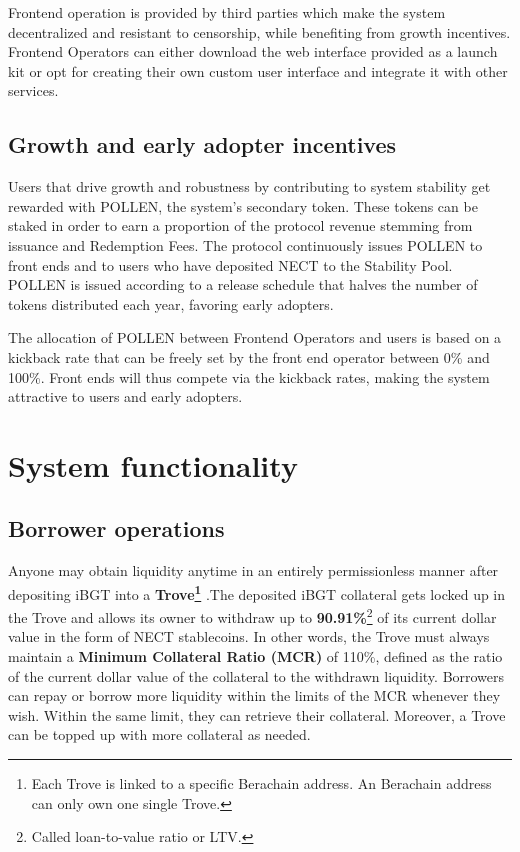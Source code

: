 \documentclass{article}
\begin{document}
Frontend operation is provided by third parties which make the system decentralized and resistant to censorship, while benefiting from growth incentives. Frontend Operators can either download the web interface provided as a launch kit or opt for creating their own custom user interface and integrate it with other services.

\subsection{Growth and early adopter incentives}
Users that drive growth and robustness by contributing to system stability get rewarded with POLLEN, the system's secondary token. These tokens can be staked in order to earn a proportion of the protocol revenue stemming from issuance and Redemption Fees. The protocol continuously issues POLLEN to front ends and to users who have deposited NECT to the Stability Pool. POLLEN is issued according to a release schedule that halves the number of tokens distributed each year, favoring early adopters.

The allocation of POLLEN between Frontend Operators and users is based on a kickback rate that can be freely set by the front end operator between 0\% and 100\%. Front ends will thus compete via the kickback rates, making the system attractive to users and early adopters.

\section{System functionality}
\subsection{Borrower operations }
Anyone may obtain liquidity anytime in an entirely permissionless manner after depositing iBGT into a \textbf{Trove\footnote{Each Trove is linked to a specific Berachain address. An Berachain address can only own one single Trove.} }.The deposited iBGT collateral gets locked up in the Trove and allows its owner to withdraw up to \textbf{90.91\%}\footnote{Called loan-to-value ratio or LTV.} of its current dollar value in the form of NECT stablecoins. In other words, the Trove must always maintain a \textbf{Minimum Collateral Ratio (MCR)} of 110\%, defined as the ratio of the current dollar value of the collateral to the withdrawn liquidity. Borrowers can repay or borrow more liquidity within the limits of the MCR whenever they wish. Within the same limit, they can retrieve their collateral. Moreover, a Trove can be topped up with more collateral as needed. 
\end{document}
